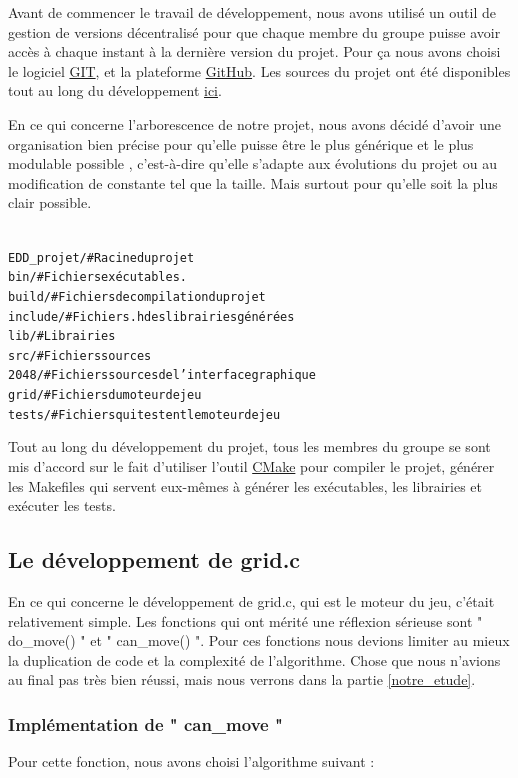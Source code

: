 \documentclass[12pt]{article}
\begin{document}
Avant de commencer le travail de développement, nous avons utilisé un
outil de gestion de versions décentralisé pour que chaque membre du groupe
puisse avoir accès à chaque instant à la dernière version du projet.
Pour ça nous avons choisi le logiciel \href{http://git-scm.com/}{GIT}, et la plateforme
\href{http://github.com/}{GitHub}. Les sources du projet ont été disponibles tout
au long du développement \href{http://github.com/kamneo/EDD_project}{ici}.\par

En ce qui concerne l'arborescence de notre projet, nous avons décidé d'avoir
une organisation bien précise pour qu'elle puisse être le plus générique et le plus modulable possible
, c'est-\`a-dire qu'elle s'adapte aux évolutions du projet ou au modification de constante tel que la taille.
Mais surtout pour qu'elle soit la plus clair possible.

\begin{alltt}
{\color{gray}
EDD_projet/        # Racine du projet
    bin/           # Fichiers exécutables.
    build/         # Fichiers de compilation du projet
    include/       # Fichiers .h des librairies générées
    lib/           # Librairies
    src/           # Fichiers sources
        2048/      # Fichiers sources de l'interface graphique
        grid/      # Fichiers du moteur de jeu
            tests/ # Fichiers qui testent le moteur de jeu
}
\end{alltt}

\par

Tout au long du développement du projet, tous les membres du groupe se sont
mis d'accord sur le fait d'utiliser l'outil \href{http://www.cmake.org/}{CMake}
pour compiler le projet, générer les Makefiles qui servent eux-mêmes à générer
les exécutables, les librairies et exécuter les tests.

\subsection{Le développement de grid.c}
En ce qui concerne le développement de grid.c, qui est le moteur du jeu,
c'était relativement simple. Les fonctions qui ont mérité une réflexion
sérieuse sont " do\_move() " et " can\_move() ". Pour ces
fonctions nous devions limiter au mieux la duplication de code et la complexité
de l'algorithme. Chose que nous n'avions au final pas très bien r\'eussi, mais
nous verrons dans la partie \ref{notre_etude}.

\subsubsection{Implémentation de " can\_move "}
Pour cette fonction, nous avons choisi l'algorithme suivant :
\end{document}
